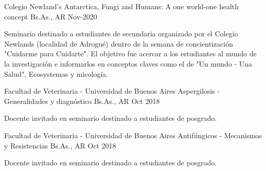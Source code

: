 \vspace{15mm}
\begin{cventries}
  \cventry
    {Colegio Newland's} %
    {Antarctica, Fungi and Humans: A one world-one health concept} %
    {Bs.As., AR} %
    {Nov-2020} %
    {
      \begin{cvitems} %
        \item {Seminario destinado a estudiantes de secundaria organizado por el Colegio Newlands (localidad de Adrogué) dentro de la semana de concientización "Cuidarme para Cuidarte". El objetivo fue acercar a los estudiantes al mundo de la investigación e informarlos en conceptos claves como el de "Un mundo - Una Salud", Ecosystemas y micología. }
      \end{cvitems}
    }
  \cventry
    {Facultad de Veterinaria - Universidad de Buenos Aires} %
    {Aspergilosis - Generalidades y diagnóstico} %
    {Bs.As., AR} %
    {Oct 2018} %
    {
      \begin{cvitems} %
        \item {Docente invitado en seminario destinado a estudiantes de posgrado.}
      \end{cvitems}
    }
  \cventry
    {Facultad de Veterinaria - Universidad de Buenos Aires} %
    {Antifúngicos - Mecanismos y Resistencias} %
    {Bs.As., AR} %
    {Oct 2018} %
    {
      \begin{cvitems} %
        \item {Docente invitado en seminario destinado a estudiantes de posgrado.}
      \end{cvitems}
    }

\end{cventries}
